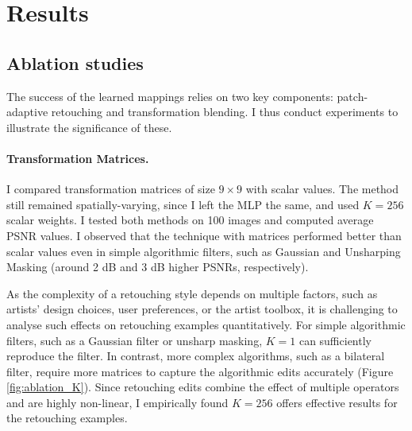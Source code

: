 \section{Results}
\label{sec:results}


\subsection{Ablation studies}\label{ablation}
The success of the learned mappings relies on two key components: patch-adaptive retouching and transformation blending. I thus conduct experiments to illustrate the significance of these.

\paragraph{Transformation Matrices.} I compared transformation matrices of size $9 \times 9$ with scalar values. The method still remained spatially-varying, since I left the MLP the same, and used $K=256$ scalar weights. I tested both methods on 100 images and computed average PSNR values. I observed that the technique with matrices performed better than scalar values even in simple algorithmic filters, such as Gaussian and Unsharping Masking (around 2 dB and 3 dB higher PSNRs, respectively). 

As the complexity of a retouching style depends on multiple factors, such as artists’ design choices, user preferences, or the artist toolbox, it is challenging to analyse such effects on retouching examples quantitatively. For simple algorithmic filters, such as a Gaussian filter or unsharp masking, $K=1$ can sufficiently reproduce the filter. In contrast, more complex algorithms, such as a bilateral filter, require more matrices to capture the algorithmic edits accurately (Figure \ref{fig:ablation_K}). Since retouching edits combine the effect of multiple operators and are highly non-linear, I empirically found $K=256$ offers effective results for the retouching examples. 

